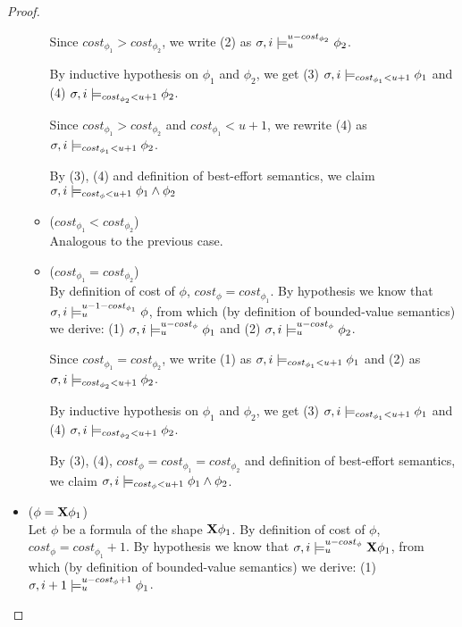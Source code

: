 \begin{theorem}
\begin{lemma}
\begin{proof}
\begin{itemize}
\begin{itemize}
        Since $cost_{\phi_1} > cost_{\phi_2}$, we write (2) as $\sigma,i \models_{u}^{u-cost_{\phi_2}} \phi_2$.

        By inductive hypothesis on $\phi_1$ and $\phi_2$, we get 
        (3) $\sigma,i \models_{cost_{\phi_1} < u + 1} \phi_1$ and 
        (4) $\sigma,i \models_{cost_{\phi_2} < u + 1} \phi_2$.

        Since $cost_{\phi_1} > cost_{\phi_2}$ and $cost_{\phi_1} < u + 1$, we rewrite (4) as $\sigma,i \models_{cost_{\phi_1} < u + 1} \phi_2$.

        By (3), (4) and definition of best-effort semantics, we claim $\sigma,i \models_{cost_\phi < u + 1} \phi_1 \land \phi_2$
        
        \item ($cost_{\phi_1} < cost_{\phi_2}$) \\
        Analogous to the previous case.
        
        \item ($cost_{\phi_1} = cost_{\phi_2}$) \\
        By definition of cost of $\phi$, $cost_\phi = cost_{\phi_1}$.
        By hypothesis we know that $\sigma,i \models_{u}^{u-1-cost_{\phi_1}} \phi$, from which (by definition of bounded-value semantics) we derive: 
        (1) $\sigma,i \models_{u}^{u-cost_{\phi}} \phi_1$ and
        (2) $\sigma,i \models_{u}^{u-cost_{\phi}} \phi_2$.

        Since $cost_{\phi_1} = cost_{\phi_2}$, we write 
        (1) as $\sigma,i \models_{cost_{\phi_1} < u + 1} \phi_1$ and
        (2) as $\sigma,i \models_{cost_{\phi_2} < u + 1} \phi_2$.

        By inductive hypothesis on $\phi_1$ and $\phi_2$, we get 
        (3) $\sigma,i \models_{cost_{\phi_1} < u + 1} \phi_1$ and 
        (4) $\sigma,i \models_{cost_{\phi_2} < u + 1} \phi_2$.

        By (3), (4), $cost_\phi = cost_{\phi_1} = cost_{\phi_2}$ and definition of best-effort semantics, we claim $\sigma,i \models_{cost_\phi < u + 1} \phi_1 \land \phi_2$.
    \end{itemize}
    
    \item ($\phi = \mathbf{X} \phi_1$) \\
    Let $\phi$ be a formula of the shape $\mathbf{X} \phi_1$.
    By definition of cost of $\phi$, $cost_\phi = cost_{\phi_1} + 1$.
    By hypothesis we know that $\sigma,i \models_{u}^{u-cost_\phi} \mathbf{X} \phi_1$, from which (by definition of bounded-value semantics) we derive: 
    (1) $\sigma,i+1 \models_{u}^{u-cost_\phi+1} \phi_1$.


\end{itemize}
\end{proof}
\end{lemma}
\end{theorem}
